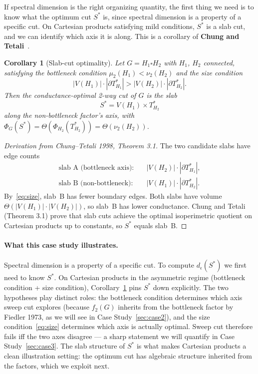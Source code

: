 \documentclass{article}
\newtheorem{corollary}{Corollary}
\theoremstyle{definition}
\theoremstyle{remark}
\begin{document}
If spectral dimension is the right organizing quantity, the first thing we need is to know what the optimum cut $S^*$ is, since spectral dimension is a property of a specific cut. On Cartesian products satisfying mild conditions, $S^*$ is a slab cut, and we can identify which axis it is along. This is a corollary of \textbf{Chung and Tetali}~\cite{chung1998isoperimetric}.

\begin{corollary}[Slab-cut optimality]
\label{cor:slab}
Let $G = H_1 \square H_2$ with $H_1$, $H_2$ connected, satisfying the bottleneck condition $\mu_2(H_1) < \nu_2(H_2)$ and the size condition
\begin{equation}
|V(H_1)| \cdot |\partial T^*_{H_1}| > |V(H_2)| \cdot |\partial T^*_{H_2}|. \tag{$\star$} \label{eq:size}
\end{equation}
Then the conductance-optimal 2-way cut of $G$ is the slab
\[
S^* = V(H_1) \times T^*_{H_2}
\]
along the non-bottleneck factor's axis, with $\Phi_G(S^*) = \Theta(\Phi_{H_2}(T^*_{H_2})) = \Theta(\nu_2(H_2))$.
\end{corollary}

\begin{proof}[Derivation from Chung--Tetali 1998, Theorem 3.1]
The two candidate slabs have edge counts
\begin{align*}
\text{slab A (bottleneck axis):}\quad & |V(H_2)| \cdot |\partial T^*_{H_1}|, \\
\text{slab B (non-bottleneck):}\quad & |V(H_1)| \cdot |\partial T^*_{H_2}|.
\end{align*}
By~\eqref{eq:size}, slab~B has fewer boundary edges. Both slabs have volume $\Theta(|V(H_1)| \cdot |V(H_2)|)$, so slab~B has lower conductance. Chung and Tetali~\cite{chung1998isoperimetric} (Theorem 3.1) prove that slab cuts achieve the optimal isoperimetric quotient on Cartesian products up to constants, so $S^*$ equals slab~B.
\end{proof}

\paragraph{What this case study illustrates.} Spectral dimension is a property of a specific cut. To compute $d_\epsilon(S^*)$ we first need to know $S^*$. On Cartesian products in the asymmetric regime (bottleneck condition + size condition), Corollary~\ref{cor:slab} pins $S^*$ down explicitly. The two hypotheses play distinct roles: the bottleneck condition determines which axis sweep cut explores (because $f_2(G)$ inherits from the bottleneck factor by Fiedler 1973, as we will see in Case Study~\ref{sec:case2}), and the size condition~\eqref{eq:size} determines which axis is actually optimal. Sweep cut therefore fails iff the two axes disagree --- a sharp statement we will quantify in Case Study~\ref{sec:case3}. The slab structure of $S^*$ is what makes Cartesian products a clean illustration setting: the optimum cut has algebraic structure inherited from the factors, which we exploit next.
\end{document}

